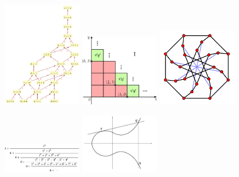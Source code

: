 \documentclass{deliverablereport}
\begin{document}
\begin{figure}[h]
\begin{center}
\end{center}\end{figure}\begin{figure}[h]\begin{center}
  \includegraphics[width=0.3\textwidth]{images/359px-F4HassePoset}
    \hspace{4px}
  \includegraphics[width=0.3\textwidth]{images/Wikipic}
    \hspace{4px}
  \includegraphics[width=0.3\textwidth]{images/500px-McGee_graph}
\end{center}\end{figure}\begin{figure}[h]\begin{center}
  \includegraphics[width=0.3\textwidth]{images/fractioncont}
    \hspace{4px}
  \includegraphics[width=0.3\textwidth]{images/elliptic-curve}

\end{center}
\end{figure}
\end{document}
